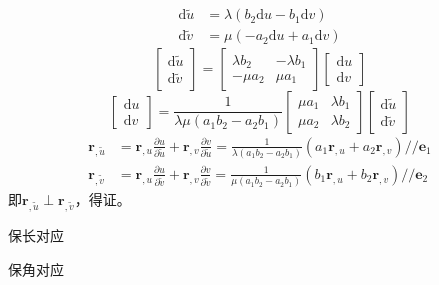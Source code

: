 \begin{equation*}
    \begin{aligned}
    \mathrm{d}\tilde{u} &=\lambda\left(b_{2}\mathrm{d}u-b_{1}\mathrm{d}v\right)\\
    \mathrm{d}\tilde{v} &=\mu\left(-a_{2}\mathrm{d}u+a_{1}\mathrm{d}v\right)
    \end{aligned}
\end{equation*}
\begin{equation*}
    \left[\begin{array}{c}
        \mathrm{d}\tilde{u} \\ \mathrm{d}\tilde{v}
    \end{array}\right] = \left[\begin{array}{cc}
        \lambda b_{2} & -\lambda b_{1} \\ -\mu a_{2} & \mu a_{1}
    \end{array}\right]\left[\begin{array}{c}
        \mathrm{d}u \\ \mathrm{d}v
    \end{array}\right]
\end{equation*}
\begin{equation*}
    \left[\begin{array}{c}
        \mathrm{d}u \\ \mathrm{d}v
    \end{array}\right] = \frac{1}{\lambda\mu\left(a_{1}b_{2}-a_{2}b_{1}\right)}\left[\begin{array}{cc}
        \mu a_{1} & \lambda b_{1} \\ \mu a_{2} & \lambda b_{2}
    \end{array}\right]\left[\begin{array}{c}
        \mathrm{d}\tilde{u} \\ \mathrm{d}\tilde{v}
    \end{array}\right]
\end{equation*}
\begin{equation*}
    \begin{aligned}
        \mathbf{r}_{,\tilde{u}} &= \mathbf{r}_{,u}\frac{\partial u}{\partial\tilde{u}} + \mathbf{r}_{,v}\frac{\partial v}{\partial\tilde{u}}
        =\frac{1}{\lambda\left(a_{1}b_{2}-a_{2}b_{1}\right)}\left(a_{1}\mathbf{r}_{,u}+a_{2}\mathbf{r}_{,v}\right) // \mathbf{e}_{1} \\
        \mathbf{r}_{,\tilde{v}} &= \mathbf{r}_{,u}\frac{\partial u}{\partial\tilde{v}} + \mathbf{r}_{,v}\frac{\partial v}{\partial\tilde{v}}
        =\frac{1}{\mu\left(a_{1}b_{2}-a_{2}b_{1}\right)}\left(b_{1}\mathbf{r}_{,u}+b_{2}\mathbf{r}_{,v}\right) // \mathbf{e}_{2}
    \end{aligned}
\end{equation*}
即$\mathbf{r}_{,\tilde{u}} \perp \mathbf{r}_{,\tilde{v}}$，得证。

保长对应

保角对应
